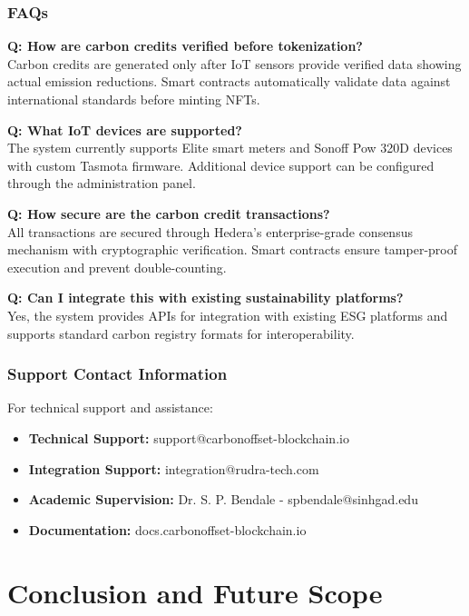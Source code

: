 \documentclass[oneside,a4paper,12pt]{book}
\begin{document}
\subsection{FAQs}

\textbf{Q: How are carbon credits verified before tokenization?}\\
Carbon credits are generated only after IoT sensors provide verified data showing actual emission reductions. Smart contracts automatically validate data against international standards before minting NFTs.

\textbf{Q: What IoT devices are supported?}\\
The system currently supports Elite smart meters and Sonoff Pow 320D devices with custom Tasmota firmware. Additional device support can be configured through the administration panel.

\textbf{Q: How secure are the carbon credit transactions?}\\
All transactions are secured through Hedera's enterprise-grade consensus mechanism with cryptographic verification. Smart contracts ensure tamper-proof execution and prevent double-counting.

\textbf{Q: Can I integrate this with existing sustainability platforms?}\\
Yes, the system provides APIs for integration with existing ESG platforms and supports standard carbon registry formats for interoperability.

\subsection{Support Contact Information}
For technical support and assistance:

\begin{itemize}
    \item \textbf{Technical Support:} support@carbonoffset-blockchain.io
    \item \textbf{Integration Support:} integration@rudra-tech.com
    \item \textbf{Academic Supervision:} Dr. S. P. Bendale - spbendale@sinhgad.edu
    \item \textbf{Documentation:} docs.carbonoffset-blockchain.io
\end{itemize}

\chapter{Conclusion and Future Scope}
\newpage
\end{document}
